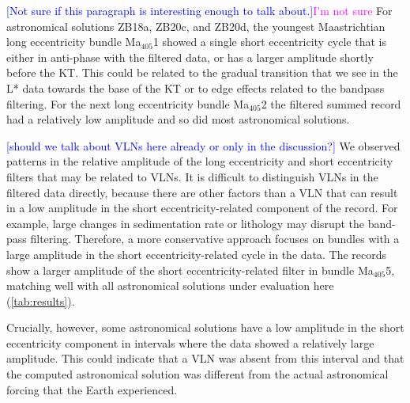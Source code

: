 \documentclass[draft]{agujournal2019}
\newcommand{\ma}[1]{Ma\(_{405}\)#1} %
\newcommand{\rez}{\textcolor{magenta}}
\newcommand{\ijk}{\textcolor{blue}}
\begin{document}
\ijk{[Not sure if this paragraph is interesting enough to talk about.]}\rez{I'm not sure}
For astronomical solutions ZB18a, ZB20c, and ZB20d, the youngest Maastrichtian long eccentricity bundle \ma{1} showed a single short eccentricity cycle that is either in anti-phase with the filtered data, or has a larger amplitude shortly before the \gls{KT}.
This could be related to the gradual transition that we see in the \gls{L*} data towards the base of the \gls{KT} or to edge effects related to the bandpass filtering.
For the next long eccentricity bundle \ma{2} the filtered summed record had a relatively low amplitude and so did most astronomical solutions.

\ijk{[should we talk about VLNs here already or only in the discussion?]}
We observed patterns in the relative amplitude of the long eccentricity and short eccentricity filters that may be related to \glspl{VLN}.
It is difficult to distinguish \glspl{VLN} in the filtered data directly, because there are other factors than a \gls{VLN} that can result in a low amplitude in the short eccentricity-related component of the record.
For example, large changes in sedimentation rate or lithology may disrupt the band-pass filtering.
Therefore, a more conservative approach focuses on bundles with a large amplitude in the short eccentricity-related cycle in the data.
The records show a larger amplitude of the short eccentricity-related filter in bundle \ma{5}, matching well with all astronomical solutions under evaluation here (\cref{tab:results}).

Crucially, however, some astronomical solutions have a low amplitude in the short eccentricity component in intervals where the data showed a relatively large amplitude.
This could indicate that a \gls{VLN} was absent from this interval and that the computed astronomical solution was different from the actual astronomical forcing that the Earth experienced.
\end{document}
